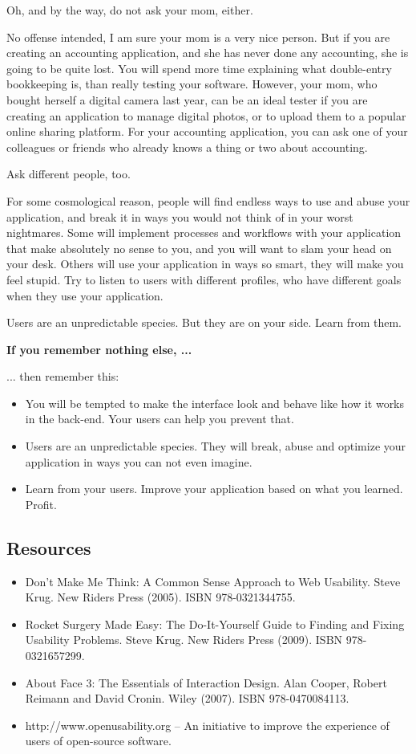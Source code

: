 Oh, and by the way, do not ask your mom, either.

No offense intended, I am sure your mom is a very nice person. But if you are creating an accounting application, and she has never done any accounting, she is going to be quite lost. You will spend more time explaining what double-entry bookkeeping is, than really testing your software. However, your mom, who bought herself a digital camera last year, can be an ideal tester if you are creating an application to manage digital photos, or to upload them to a popular online sharing platform. For your accounting application, you can ask one of your colleagues or friends who already knows a thing or two about accounting.

Ask different people, too.

For some cosmological reason, people will find endless ways to use and abuse your application, and break it in ways you would not think of in your worst nightmares. Some will implement processes and workflows with your application that make absolutely no sense to you, and you will want to slam your head on your desk. Others will use your application in ways so smart, they will make you feel stupid. Try to listen to users with different profiles, who have different goals when they use your application.

Users are an unpredictable species. But they are on your side. Learn from them.

\textbf{If you remember nothing else, ...}

... then remember this:
\begin{itemize}
 \item You will be tempted to make the interface look and behave like how it works in the back-end. Your users can help you prevent that.
 \item Users are an unpredictable species. They will break, abuse and optimize your application in ways you can not even imagine.
 \item Learn from your users. Improve your application based on what you learned. Profit.
\end{itemize}

\subsection*{Resources}
\begin{itemize}
 \item  Don't Make Me Think: A Common Sense Approach to Web Usability. Steve Krug. New Riders Press (2005). ISBN 978-0321344755.
 \item Rocket Surgery Made Easy: The Do-It-Yourself Guide to Finding and Fixing Usability Problems. Steve Krug. New Riders Press (2009). ISBN 978-0321657299.
 \item About Face 3: The Essentials of Interaction Design. Alan Cooper, Robert Reimann and David Cronin. Wiley (2007). ISBN 978-0470084113.
 \item http://www.openusability.org – An initiative to improve the experience of users of open-source software.
\end{itemize}
